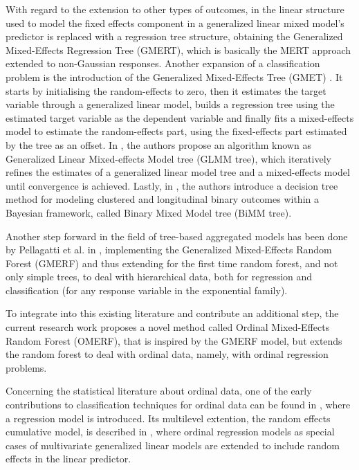With regard to the extension to other types of outcomes, in \cite{hajjem2017generalized} the linear structure used to model the fixed effects component in a generalized linear mixed model's predictor is replaced with a regression tree structure, obtaining the Generalized Mixed-Effects Regression Tree (GMERT), which is basically the MERT approach extended to non-Gaussian responses.
Another expansion of a classification problem is the introduction of the Generalized Mixed-Effects Tree (GMET) \cite{fontana2021performing}. It starts by initialising the random-effects to zero, then it estimates the target variable through a generalized linear model, builds a regression tree using
the estimated target variable as the dependent variable and finally fits a mixed-effects model to estimate the random-effects part, using the fixed-effects part estimated by the tree as an offset.
In \cite{fokkema2018detecting}, the authors propose an algorithm known as Generalized Linear Mixed-effects Model tree (GLMM tree), which iteratively refines the estimates of a generalized linear model tree and a mixed-effects model until convergence is achieved.
Lastly, in \cite{speiser2020bimm}, the authors introduce a decision tree method for modeling clustered and longitudinal binary outcomes within a Bayesian framework, called Binary Mixed Model tree (BiMM tree).

Another step forward in the field of tree-based aggregated models has been done by Pellagatti et al. in \cite{pellagatti2021generalized}, implementing the Generalized Mixed-Effects Random Forest (GMERF) and thus extending for the first time random forest, and not only simple trees, to deal with hierarchical data, both for regression and classification (for any response variable in the exponential family).

To integrate into this existing literature and contribute an additional step, the current research work proposes a novel method called Ordinal Mixed-Effects Random Forest (OMERF), that is inspired by the GMERF model, but extends the random forest to deal with ordinal data, namely, with ordinal regression problems.

Concerning the statistical literature about ordinal data, one of the early contributions to classification techniques for ordinal data can be found in \cite{mccullagh1980regression}, where a regression model is introduced. Its multilevel extention, the random effects cumulative model, is described in \cite{tutz1996random}, where ordinal regression models as special cases of multivariate generalized linear models are extended to include random effects in the linear predictor.

